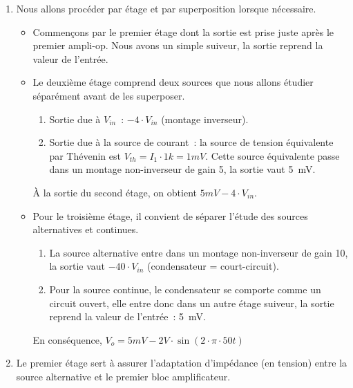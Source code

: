 \documentclass{../../template/tp}
\begin{document}
{
    \begin{enumerate}
        \item Nous allons procéder par étage et par superposition lorsque nécessaire.
        \begin{itemize}
            \item Commençons par le premier étage dont la sortie est prise juste après le premier ampli-op.
            Nous avons un simple suiveur, la sortie reprend la valeur de l'entrée.

            \item Le deuxième étage comprend deux sources que nous allons étudier séparément avant de les superposer.
            \begin{enumerate}[label=\alph*)]
                \item Sortie due à $V_{in}$~: $-4 \cdot V_{in}$ (montage inverseur).
                \item Sortie due à la source de courant~: la source de tension équivalente par Thévenin est $V_{th} = I_1 \cdot 1k = 1 mV$.
                Cette source équivalente passe dans un montage non-inverseur de gain 5, la sortie vaut 5~mV.
            \end{enumerate}

            À la sortie du second étage, on obtient $5 mV - 4 \cdot V_{in}$.

            \item Pour le troisième étage, il convient de séparer l'étude des sources alternatives et continues.
            \begin{enumerate}[label=\alph*)]
                \item La source alternative entre dans un montage non-inverseur de gain 10, la sortie vaut $-40 \cdot V_{in}$ (condensateur = court-circuit).
                \item Pour la source continue, le condensateur se comporte comme un circuit ouvert, elle entre donc dans un autre étage suiveur, la sortie reprend la valeur de l'entrée~: 5~mV.
            \end{enumerate}

            En conséquence, $V_o = 5 mV - 2 V \cdot \sin(2\cdot \pi \cdot 50 t)$
        \end{itemize}

        \item Le premier étage sert à assurer l'adaptation d'impédance (en tension) entre la source alternative et le premier bloc amplificateur.
    \end{enumerate}

}
\end{document}
